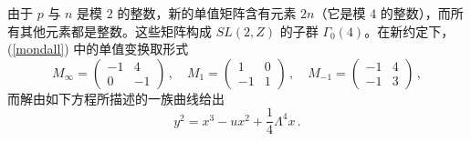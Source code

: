 
由于 $p$ 与 $n$ 是模 $2$ 的整数，新的单值矩阵含有元素 $2n$（它是模 $4$
的整数），而所有其他元素都是整数。这些矩阵构成 $SL(2,Z)$ 的子群
$\Gamma_{0}(4)$。在新约定下，(\ref{mondall}) 中的单值变换取形式
\begin{equation}
M_{\infty} = \left( \begin{array}{cc}
-1 & 4 \\ 0 & -1 \end{array} \right )\,, \quad
M_{1} = \left( \begin{array}{cc}
1 & 0 \\ -1 & 1 \end{array} \right )\,, \quad
M_{-1} = \left( \begin{array}{cc}
-1 & 4 \\ -1 & 3 \end{array} \right )\,,
\end{equation}
而解由如下方程所描述的一族曲线给出
\begin{equation}
y^2 = x^3 - ux^2 + \frac{1}{4} \Lambda^4 x \,.
\label{f2}
\end{equation}


